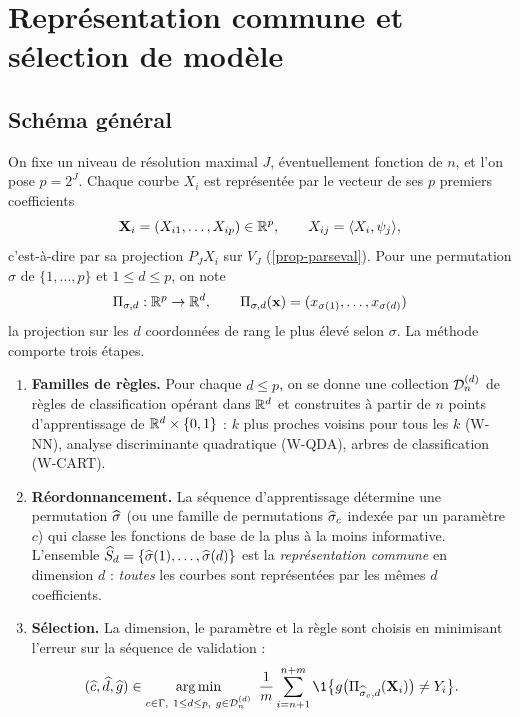 \chapter{Représentation commune et sélection de modèle}\label{chap-methode}

\section{Schéma général}\label{sec-schema}

On fixe un niveau de résolution maximal $J$, éventuellement fonction de $n$, et l'on pose $p=2^J$. Chaque courbe $X_i$ est représentée par le vecteur de ses $p$ premiers coefficients
\[
  \mathbf{X}_i=(X_{i1},\dots,X_{ip})\in\mathbb{R}^p,\qquad X_{ij}=\langle X_i,\psi_j\rangle,
\]
c'est-à-dire par sa projection $P_JX_i$ sur $V_J$ (\cref{prop-parseval}). Pour une permutation $\sigma$ de $\{1,\dots,p\}$ et $1\le d\le p$, on note
\[
  \Pi_{\sigma,d}:\mathbb{R}^p\to\mathbb{R}^d,\qquad \Pi_{\sigma,d}(\mathbf{x})=(x_{\sigma(1)},\dots,x_{\sigma(d)})
\]
la projection sur les $d$ coordonnées de rang le plus élevé selon $\sigma$. La méthode comporte trois étapes.

\begin{enumerate}
  \item \textbf{Familles de règles.} Pour chaque $d\le p$, on se donne une collection $\mathcal{D}_n^{(d)}$ de règles de classification opérant dans $\mathbb{R}^d$ et construites à partir de $n$ points d'apprentissage de $\mathbb{R}^d\times\{0,1\}$ : $k$ plus proches voisins pour tous les $k$ (W-NN), analyse discriminante quadratique (W-QDA), arbres de classification (W-CART).
  \item \textbf{Réordonnancement.} La séquence d'apprentissage détermine une permutation $\widehat{\sigma}$ (ou une famille de permutations $\widehat{\sigma}_c$ indexée par un paramètre $c$) qui classe les fonctions de base de la plus à la moins informative. L'ensemble $\widehat{S}_d=\{\widehat{\sigma}(1),\dots,\widehat{\sigma}(d)\}$ est la \emph{représentation commune} en dimension $d$ : \emph{toutes} les courbes sont représentées par les mêmes $d$ coefficients.
  \item \textbf{Sélection.} La dimension, le paramètre et la règle sont choisis en minimisant l'erreur sur la séquence de validation :
  \begin{equation}\label{eq-selection}
    (\hc,\hd,\hg)\in\argmin_{c\in\Gamma,\ 1\le d\le p,\ g\in\cD_n^{(d)}}\ \frac1m\sum_{i=n+1}^{n+m}\1\bigl\{g\bigl(\Pi_{\hsigma_c,d}(\bX_i)\bigr)\neq Y_i\bigr\}.
  \end{equation}
\end{enumerate}


